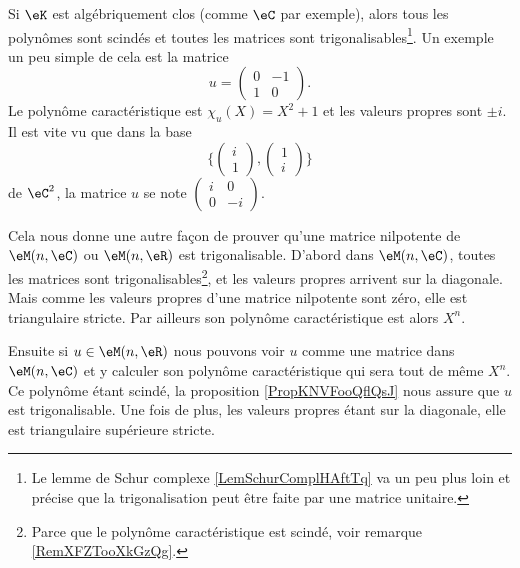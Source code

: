 \begin{remark}  \label{RemXFZTooXkGzQg}
    Si \( \eK\) est algébriquement clos (comme \( \eC\) par exemple), alors tous les polynômes sont scindés et toutes les matrices sont trigonalisables\footnote{Le lemme de Schur complexe \ref{LemSchurComplHAftTq} va un peu plus loin et précise que la trigonalisation peut être faite par une matrice unitaire.}. Un exemple un peu simple de cela est la matrice
    \begin{equation}
        u=\begin{pmatrix}
            0    &   -1    \\ 
            1    &   0    
        \end{pmatrix}.
    \end{equation}
    Le polynôme caractéristique est \( \chi_u(X)=X^2+1\) et les valeurs propres sont \( \pm i\). Il est vite vu que dans la base
    \begin{equation}
        \{ \begin{pmatrix}
        i    \\ 
    1    
\end{pmatrix}, \begin{pmatrix}
1    \\ 
i    
\end{pmatrix}\}
    \end{equation}
    de \( \eC^2\), la matrice \( u\) se note \( \begin{pmatrix}
        i    &   0    \\ 
        0    &   -i    
    \end{pmatrix}\).
\end{remark}

\begin{remark}  \label{RemREOSooGEDJWX}
    Cela nous donne une autre façon de prouver qu'une matrice nilpotente de \( \eM(n,\eC)\) ou \( \eM(n,\eR)\) est trigonalisable\cite{KDUFooVxwqlC}. D'abord dans \( \eM(n,\eC)\), toutes les matrices sont trigonalisables\footnote{Parce que le polynôme caractéristique est scindé, voir remarque \ref{RemXFZTooXkGzQg}.}, et les valeurs propres arrivent sur la diagonale. Mais comme les valeurs propres d'une matrice nilpotente sont zéro, elle est triangulaire stricte. Par ailleurs son polynôme caractéristique est alors \( X^n\).

    Ensuite si \( u\in \eM(n,\eR)\) nous pouvons voir \( u\) comme une matrice dans \( \eM(n,\eC)\) et y calculer son polynôme caractéristique qui sera tout de même \( X^n\). Ce polynôme étant scindé, la proposition \ref{PropKNVFooQflQsJ} nous assure que \( u\) est trigonalisable. Une fois de plus, les valeurs propres étant sur la diagonale, elle est triangulaire supérieure stricte.
\end{remark}

